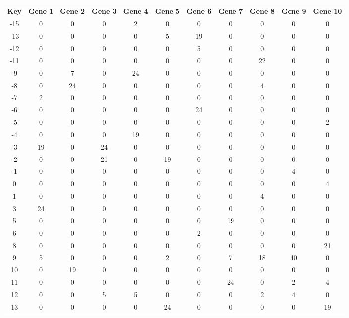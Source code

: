 \begin{tabular}{|c|c|c|c|c|c|c|c|c|c|c|}
\hline
Key & Gene 1 & Gene 2 & Gene 3 & Gene 4 & Gene 5 & Gene 6 & Gene 7 & Gene 8 & Gene 9 & Gene 10 \\
\hline
-15 & 0 & 0 & 0 & 2 & 0 & 0 & 0 & 0 & 0 & 0 \\
-13 & 0 & 0 & 0 & 0 & 5 & 19 & 0 & 0 & 0 & 0 \\
-12 & 0 & 0 & 0 & 0 & 0 & 5 & 0 & 0 & 0 & 0 \\
-11 & 0 & 0 & 0 & 0 & 0 & 0 & 0 & 22 & 0 & 0 \\
-9 & 0 & 7 & 0 & 24 & 0 & 0 & 0 & 0 & 0 & 0 \\
-8 & 0 & 24 & 0 & 0 & 0 & 0 & 0 & 4 & 0 & 0 \\
-7 & 2 & 0 & 0 & 0 & 0 & 0 & 0 & 0 & 0 & 0 \\
-6 & 0 & 0 & 0 & 0 & 0 & 24 & 0 & 0 & 0 & 0 \\
-5 & 0 & 0 & 0 & 0 & 0 & 0 & 0 & 0 & 0 & 2 \\
-4 & 0 & 0 & 0 & 19 & 0 & 0 & 0 & 0 & 0 & 0 \\
-3 & 19 & 0 & 24 & 0 & 0 & 0 & 0 & 0 & 0 & 0 \\
-2 & 0 & 0 & 21 & 0 & 19 & 0 & 0 & 0 & 0 & 0 \\
-1 & 0 & 0 & 0 & 0 & 0 & 0 & 0 & 0 & 4 & 0 \\
0 & 0 & 0 & 0 & 0 & 0 & 0 & 0 & 0 & 0 & 4 \\
1 & 0 & 0 & 0 & 0 & 0 & 0 & 0 & 4 & 0 & 0 \\
3 & 24 & 0 & 0 & 0 & 0 & 0 & 0 & 0 & 0 & 0 \\
5 & 0 & 0 & 0 & 0 & 0 & 0 & 19 & 0 & 0 & 0 \\
6 & 0 & 0 & 0 & 0 & 0 & 2 & 0 & 0 & 0 & 0 \\
8 & 0 & 0 & 0 & 0 & 0 & 0 & 0 & 0 & 0 & 21 \\
9 & 5 & 0 & 0 & 0 & 2 & 0 & 7 & 18 & 40 & 0 \\
10 & 0 & 19 & 0 & 0 & 0 & 0 & 0 & 0 & 0 & 0 \\
11 & 0 & 0 & 0 & 0 & 0 & 0 & 24 & 0 & 2 & 4 \\
12 & 0 & 0 & 5 & 5 & 0 & 0 & 0 & 2 & 4 & 0 \\
13 & 0 & 0 & 0 & 0 & 24 & 0 & 0 & 0 & 0 & 19 \\
\hline
\end{tabular}